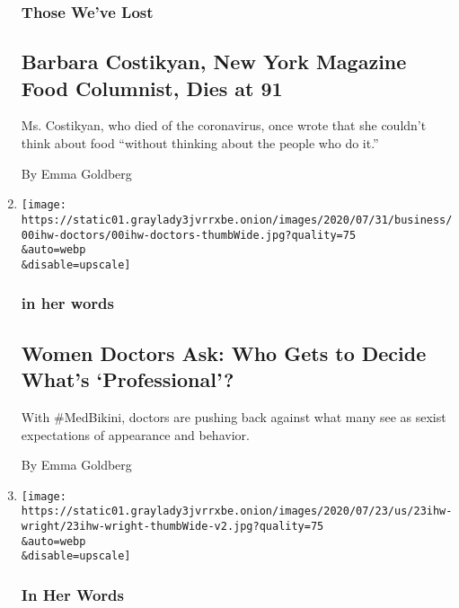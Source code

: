 \begin{enumerate}
{  \subsubsection{Those We've Lost}\label{those-weve-lost}}

  \hypertarget{barbara-costikyan-new-york-magazine-food-columnist-dies-at-91}{%
  \subsection{Barbara Costikyan, New York Magazine Food Columnist, Dies
  at
  91}\label{barbara-costikyan-new-york-magazine-food-columnist-dies-at-91}}

  Ms. Costikyan, who died of the coronavirus, once wrote that she
  couldn't think about food ``without thinking about the people who do
  it.''

  By Emma Goldberg
\item
  \href{/2020/08/02/us/women-doctors-medbikini-professional-gender-bias.html}{}

  \texttt{[image: https://static01.graylady3jvrrxbe.onion/images/2020/07/31/business/00ihw-doctors/00ihw-doctors-thumbWide.jpg?quality=75\\\&auto=webp\\\&disable=upscale]}

  \hypertarget{in-her-words-1}{%
  \subsubsection{in her words}\label{in-her-words-1}}

  \hypertarget{women-doctors-ask-who-gets-to-decide-whats-professional}{%
  \subsection{Women Doctors Ask: Who Gets to Decide What's
  `Professional'?}\label{women-doctors-ask-who-gets-to-decide-whats-professional}}

  With \#MedBikini, doctors are pushing back against what many see as
  sexist expectations of appearance and behavior.

  By Emma Goldberg
\item
  \href{/2020/07/24/us/climate-change-green-new-deal-covid-coronavirus.html}{}

  \texttt{[image: https://static01.graylady3jvrrxbe.onion/images/2020/07/23/us/23ihw-wright/23ihw-wright-thumbWide-v2.jpg?quality=75\\\&auto=webp\\\&disable=upscale]}

  \hypertarget{in-her-words-2}{%
  \subsubsection{In Her Words}\label{in-her-words-2}}


\end{enumerate}
